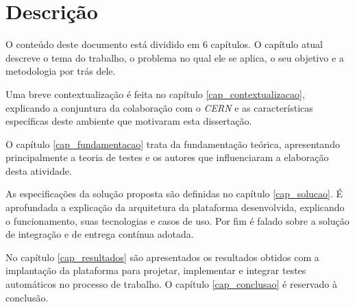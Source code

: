 \section{Descrição}
O conteúdo deste documento está dividido em 6 capítulos. O capítulo atual descreve o tema do trabalho, o problema no qual ele se aplica, o seu objetivo e a metodologia por trás dele.

Uma breve contextualização é feita no capítulo \ref{cap_contextualizacao}, explicando a conjuntura da colaboração com o \emph{CERN} e as características específicas deste ambiente que motivaram esta dissertação.

O capítulo \ref{cap_fundamentacao} trata da fundamentação teórica, apresentando principalmente a teoria de testes e os autores que influenciaram a elaboração desta atividade.

As especificações da solução proposta são definidas no capítulo \ref{cap_solucao}. É aprofundada a explicação da arquitetura da plataforma desenvolvida, explicando o funcionamento, suas tecnologias e casos de uso. Por fim é falado sobre a solução de integração e de entrega contínua adotada.

No capítulo \ref{cap_resultados} são apresentados os resultados obtidos com a implantação da plataforma para projetar, implementar e integrar testes automáticos no processo de trabalho. O capítulo \ref{cap_conclusao} é reservado à conclusão.
